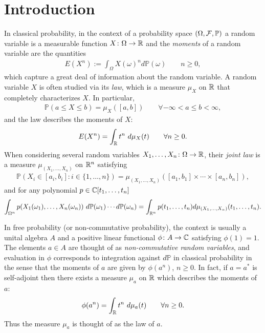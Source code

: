
%
%

\chapter{Introduction}

In classical probability, in the context of a probability space $(\Omega,\mathcal{F},\mathbb{P})$ a random variable is a measurable function $X\colon \Omega\to \mathbb{R}$ and the \emph{moments} of a random variable are the quantities
	\begin{align*}
		E(X^n):=\int_\Omega X(\omega)^n d\mathbb{P}(\omega)\qquad n\geq 0,
	\end{align*}
which capture a great deal of information about the random variable. A random variable $X$ is often studied via its \emph{law}, which is a measure $\mu_X$ on $\mathbb{R}$ that completely characterizes $X$. In particular,
	\begin{align*}
		\mathbb{P}(a\leq X\leq b) = \mu_X([a,b])\qquad \forall -\infty<a\leq b<\infty,
	\end{align*}
and the law describes the moments of $X$:
	\begin{align*}
		E(X^n) = \int_{\mathbb{R}} t^n\ d\mu_X(t) \qquad \forall n\geq 0.
	\end{align*}
When considering several random variables $X_1,\ldots, X_n\colon \Omega\to \mathbb{R}$, their \emph{joint law} is a measure $\mu_{(X_1,\ldots, X_n)}$ on $\mathbb{R}^n$ satisfying
	\begin{align*}
		\mathbb{P}(X_i\in [a_i,b_i]\colon i\in\{1,\ldots,n\}) = \mu_{(X_1,\ldots, X_n)}( [a_1,b_1]\times\cdots \times [a_n,b_n]),
	\end{align*}
and for any polynomial $p\in \mathbb{C}[t_1,\ldots, t_n]$
	\begin{align*}
		\int_{\Omega^n} p(X_1(\omega_1),\ldots, X_n(\omega_n))\ d\mathbb{P}(\omega_1)\cdots d\mathbb{P}(\omega_n) = \int_{\R^n} p(t_1,\ldots, t_n) d\mu_{(X_1,\ldots, X_n)}(t_1,\ldots, t_n).
	\end{align*}
	
In free probability (or non-commutative probability), the context is usually a unital algebra $A$ and a positive linear functional $\phi\colon A\to \mathbb{C}$ satisfying $\phi(1)=1$. The elements $a\in A$ are thought of as \emph{non-commutative random variables}, and evaluation in $\phi$ corresponds to integration against $d\mathbb{P}$ in classical probability in the sense that the moments of $a$ are given by $\phi(a^n)$, $n\geq 0$. In fact, if $a=a^*$ is self-adjoint then there exists a measure $\mu_a$ on $\mathbb{R}$ which describes the moments of $a$:
	\begin{align*}
		\phi(a^n) = \int_{\mathbb{R}} t^n\ d\mu_a(t)\qquad \forall n\geq 0.
	\end{align*}
Thus the measure $\mu_a$ is thought of as the law of $a$.

